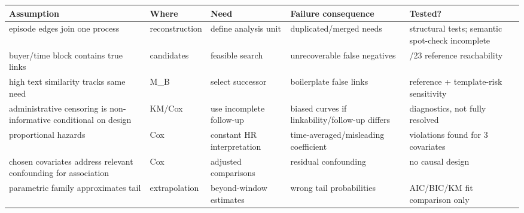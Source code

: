 {\def\LTcaptype{none} %
\begin{longtable}[]{@{}
  >{\raggedright\arraybackslash}p{}
  >{\raggedright\arraybackslash}p{}
  >{\raggedright\arraybackslash}p{}
  >{\raggedright\arraybackslash}p{}
  >{\raggedright\arraybackslash}p{}@{}}
\toprule\noalign{}
\begin{minipage}[b]{\linewidth}\raggedright
Assumption
\end{minipage} & \begin{minipage}[b]{\linewidth}\raggedright
Where
\end{minipage} & \begin{minipage}[b]{\linewidth}\raggedright
Need
\end{minipage} & \begin{minipage}[b]{\linewidth}\raggedright
Failure consequence
\end{minipage} & \begin{minipage}[b]{\linewidth}\raggedright
Tested?
\end{minipage} \\
\midrule\noalign{}
\endhead
\bottomrule\noalign{}
\endlastfoot
episode edges join one process & reconstruction & define analysis unit &
duplicated/merged needs & structural tests; semantic spot-check
incomplete \\
buyer/time block contains true links & candidates & feasible search &
unrecoverable false negatives & 21/23 reference reachability \\
high text similarity tracks same need & M\_B & select successor &
boilerplate false links & reference + template-risk sensitivity \\
administrative censoring is non-informative conditional on design &
KM/Cox & use incomplete follow-up & biased curves if
linkability/follow-up differs & diagnostics, not fully resolved \\
proportional hazards & Cox & constant HR interpretation &
time-averaged/misleading coefficient & violations found for 3
covariates \\
chosen covariates address relevant confounding for association & Cox &
adjusted comparisons & residual confounding & no causal design \\
parametric family approximates tail & extrapolation & beyond-window
estimates & wrong tail probabilities & AIC/BIC/KM fit comparison only \\

\end{longtable}}
